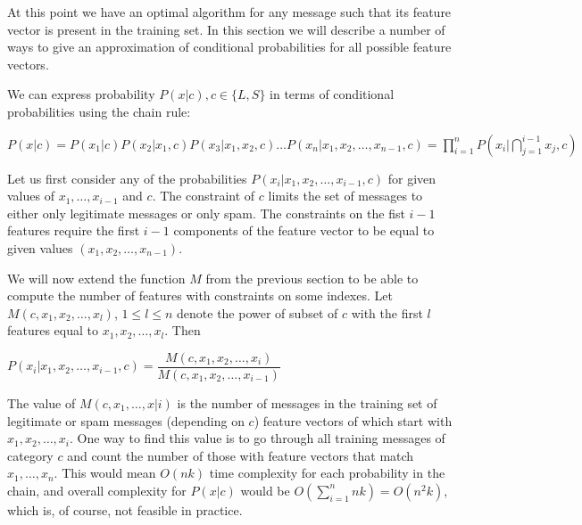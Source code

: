 \documentclass[12pt]{report}
\makeatletter
\renewcommand{\subsection}{\@startsection{subsection}{2}{0mm}{-\baselineskip}{-5pt}{\bf}}
\makeatother
\begin{document}
At this point we have an optimal algorithm for any message such that its feature vector is present in the training set. In this section we will describe a number of ways to give an approximation of conditional probabilities for all possible feature vectors.

\subsection{Chain rule}

We can express probability $P(x | c), c \in \{L, S\}$ in terms of conditional probabilities using the chain rule:

\begin{center}
	$P(x | c) = P(x_1 | c) P(x_2 | x_1, c) P(x_3 | x_1, x_2, c) \dots P(x_n | x_1, x_2, \dots, x_{n - 1}, c) = \prod_{i=1}^{n}P(x_i | \bigcap_{j = 1}^{i - 1} x_j, c)$
\end{center}

Let us first consider any of the probabilities $P(x_i | x_1, x_2, \dots, x_{i-1}, c)$ for given values of $x_1, \dots, x_{i - 1}$ and $c$. The constraint of $c$ limits the set of messages to either only legitimate messages or only spam. The constraints on the fist $i - 1$ features require the first $i - 1$ components of the feature vector to be equal to given values $(x_1, x_2, \dots, x_{n-1})$.

We will now extend the function $M$ from the previous section to be able to compute the number of features with constraints on some indexes. Let $M(c, x_1, x_2, \dots, x_l)$, $1 \leq l \leq n$ denote the power of subset of $c$ with the first $l$ features equal to $x_1, x_2, \dots, x_l$. Then

\begin{center}
	$P(x_i | x_1, x_2, \dots, x_{i-1}, c) = \dfrac{M(c, x_1, x_2, \dots, x_i)}{M(c, x_1, x_2, \dots, x_{i-1})}$
\end{center}

The value of $M(c, x_1, \dots, x|i)$ is the number of messages in the training set of legitimate or spam messages (depending on $c$) feature vectors of which start with $x_1, x_2, \dots, x_i$. One way to find this value is to go through all training messages of category $c$ and count the number of those with feature vectors that match $x_1, \dots, x_n$. This would mean $O(nk)$ time complexity for each probability in the chain, and overall complexity for $P(x | c)$ would be $O(\sum_{i=1}^{n} nk) = O(n^2 k)$, which is, of course, not feasible in practice.
\end{document}
